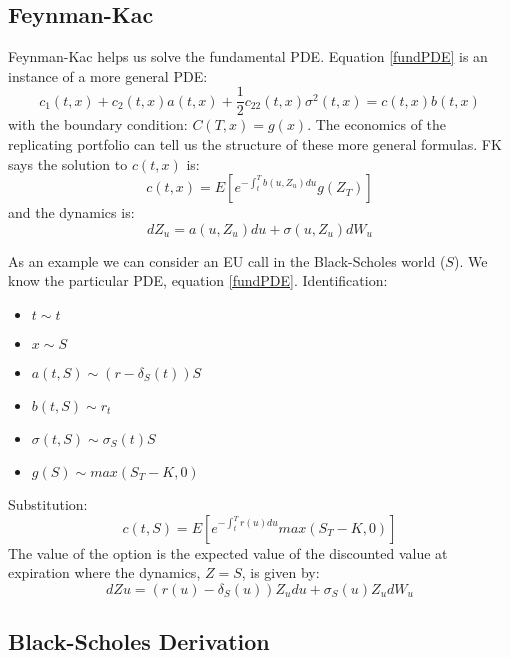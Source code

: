 \documentclass[12pt]{article}
\begin{document}
\subsection{Feynman-Kac}

Feynman-Kac helps us solve the fundamental PDE. Equation \ref{fundPDE} is an
instance of a more general PDE:
$$c_1(t,x)+c_2(t,x)a(t,x)+\frac{1}{2}c_{22}(t,x)\sigma^2(t,x)=c(t,x)b(t,x)$$
with the boundary condition: $C(T,x)=g(x)$.
The economics of the replicating portfolio can tell us the structure of these
more general formulas.
FK says the solution to $c(t,x)$ is:
\begin{equation} \label{feynkacGen}
  c(t,x)=E\left[ e^{-\int_t^Tb(u,Z_u)du}g(Z_T) \right]
\end{equation}
and the dynamics is:
$$dZ_u=a(u,Z_u)du+\sigma(u,Z_u)dW_u$$

As an example we can consider an EU call in the Black-Scholes world ($S$). We
know the particular PDE, equation \ref{fundPDE}. Identification:
\begin{itemize}
\item $t\sim t$
\item $x\sim S$
\item $a(t,S)\sim (r-\delta_S(t))S$
\item $b(t,S)\sim r_t$
\item $\sigma(t,S)\sim \sigma_S(t)S$
\item $g(S)\sim max(S_T-K,0)$
\end{itemize}
Substitution:
\begin{equation} \label{feynkacPar}
  c(t,S)=E\left[ e^{-\int_t^Tr(u)du}max(S_T-K,0) \right]
\end{equation}
The value of the option is the expected value of the discounted value at
expiration where the dynamics, $Z=S$, is given by:
\begin{equation} \label{feynkacParDyn}
dZu=(r(u)-\delta_S(u))Z_udu+\sigma_S(u)Z_udW_u
\end{equation}

\subsection{Black-Scholes Derivation} \label{sec:BS}
\end{document}

